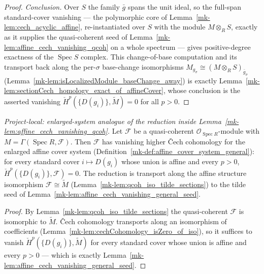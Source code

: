 \begin{proof}
  \emph{Conclusion.} Over \(S\) the family \(\bar g\) spans the unit ideal, so the full-span standard-cover
  vanishing --- the polymorphic core of Lemma~\ref{mk-lem:cech_acyclic_affine}, re-instantiated over \(S\) with
  the module \(M \otimes_R S\), exactly as it supplies the quasi-coherent seed of
  Lemma~\ref{mk-lem:affine_cech_vanishing_qcoh} on a whole spectrum --- gives positive-degree exactness of the
  \(\operatorname{Spec} S\) complex. This change-of-base computation and its transport back along the
  per-\(\sigma\) base-change isomorphisms \(M_{g_\sigma} \cong (M \otimes_R S)_{\bar g_\sigma}\)
  (Lemma~\ref{mk-lem:isLocalizedModule_baseChange_away}) is exactly
  Lemma~\ref{mk-lem:sectionCech_homology_exact_of_affineCover}, whose conclusion is the asserted vanishing
  \(\check{H}^p(\{D(g_i)\}, \widetilde{M}) = 0\) for all \(p > 0\).
\end{proof}

\begin{lemma}\label{mk-lem:affine_cech_vanishing_general_of_tildeVanishing}
  \leanok

  \textit{Project-local: enlarged-system analogue of the reduction inside
  Lemma~\ref{mk-lem:affine_cech_vanishing_qcoh}.}
  Let \(\mathcal{F}\) be a quasi-coherent \(\mathcal{O}_{\operatorname{Spec} R}\)-module with
  \(M = \Gamma(\operatorname{Spec} R, \mathcal{F})\). Then \(\mathcal{F}\) has vanishing higher {\v C}ech
  cohomology for the enlarged affine cover system (Definition~\ref{mk-def:affine_cover_system_general}): for
  every standard cover \(i \mapsto D(g_i)\) whose union is affine and every \(p > 0\),
  \(\check{H}^p(\{D(g_i)\}, \mathcal{F}) = 0\). The reduction is transport along the affine structure
  isomorphism \(\mathcal{F} \cong \widetilde{M}\) (Lemma~\ref{mk-lem:qcoh_iso_tilde_sections}) to the tilde
  seed of Lemma~\ref{mk-lem:affine_cech_vanishing_general_seed}.
\end{lemma}
\begin{proof}
  \leanok
  By Lemma~\ref{mk-lem:qcoh_iso_tilde_sections} the quasi-coherent \(\mathcal{F}\) is isomorphic to
  \(\widetilde{M}\). {\v C}ech cohomology transports along an isomorphism of coefficients
  (Lemma~\ref{mk-lem:cechCohomology_isZero_of_iso}), so it suffices to vanish
  \(\check{H}^p(\{D(g_i)\}, \widetilde{M})\) for every standard cover whose union is affine and every
  \(p > 0\) --- which is exactly Lemma~\ref{mk-lem:affine_cech_vanishing_general_seed}.
\end{proof}

